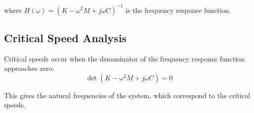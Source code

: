 where $H(\omega) = (K - \omega^2 M + j\omega C)^{-1}$ is the frequency response function.

\subsection{Critical Speed Analysis}

Critical speeds occur when the denominator of the frequency response function approaches zero:
\begin{equation}
\det(K - \omega^2 M + j\omega C) = 0
\end{equation}

This gives the natural frequencies of the system, which correspond to the critical speeds.

